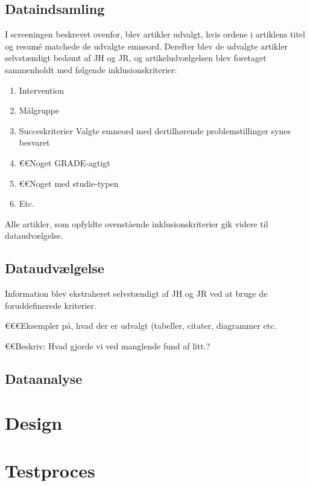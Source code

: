 	\subsection{Dataindsamling}
	I screeningen beskrevet ovenfor, blev artikler udvalgt, hvis ordene i artiklens titel og resumé matchede de udvalgte emneord. Derefter blev de udvalgte artikler selvstændigt bedømt af JH og JR, og artikeludvælgelsen blev foretaget sammenholdt med følgende inklusionskriterier:
	
		\begin{enumerate}
			\item Intervention
			\item Målgruppe
			\item Succeskriterier 
			Valgte emneord med dertilhørende problemstillinger synes besvaret
			\item €€Noget GRADE-agtigt 
			\item €€Noget med studie-typen
			\item Etc. 
		\end{enumerate} 
		
	Alle artikler, som opfyldte ovenstående inklusionskriterier gik videre til dataudvælgelse. 	
		
	\subsection{Dataudvælgelse}	
	Information blev ekstraheret selvstændigt af JH og JR ved at bruge de foruddefinerede kriterier.  
	
	€€€Eksempler på, hvad der er udvalgt (tabeller, citater, diagrammer etc.
	
	
	€€Beskriv: Hvad gjorde vi ved manglende fund af litt.? 
	
	\subsection{Dataanalyse} 
 

\section{Design}
\section{Testproces}	

